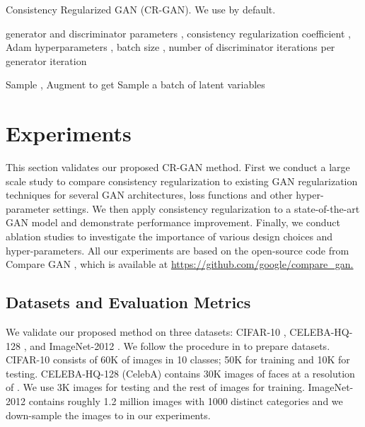 \documentclass{article} \usepackage{iclr2020_conference,times}
\begin{document}
\begin{algorithm}[t]
    \caption{Consistency Regularized GAN (CR-GAN). We use  by default.} 
    \label{alg:main}
\begin{algorithmic}[1]
    \renewcommand{\algorithmicrequire}{\textbf{Input:}}
    \renewcommand{\algorithmicensure}{\textbf{Output:}}
    \Require generator and discriminator parameters , consistency regularization coefficient , Adam hyperparameters , batch size , number of discriminator iterations per generator iteration 
    
     \For{}            \For{}
    \State Sample ,  
    \State Augment  to get 
    \State 
    \State 
    \EndFor
    \State 
    \EndFor
    \State  Sample a batch of latent variables   \State 
    \EndFor
\end{algorithmic}
\end{algorithm}



\section{Experiments}
\label{section:experiments}

This section validates our proposed CR-GAN method. First we conduct a large scale study to compare consistency regularization to existing GAN regularization techniques \citep{kodali2017convergence, WGANGP, RothLNH17} for several GAN architectures, loss functions and other hyper-parameter settings. 
We then apply consistency regularization to a state-of-the-art GAN model \citep{BIGGAN} 
and demonstrate performance improvement.
Finally, we conduct ablation studies to investigate the importance of various design choices 
and hyper-parameters. 
All our experiments are based on the open-source code from Compare GAN \citep{compare_gan},
which is available at 
{\href{https://github.com/google/compare\_gan}{https://github.com/google/compare\_gan.}}

\subsection{Datasets and Evaluation Metrics}
We validate our proposed method on three datasets: CIFAR-10 \citep{cifar10}, 
CELEBA-HQ-128 \citep{PROGRESSIVEGAN}, and ImageNet-2012 \citep{IMAGENET}.
We follow the procedure in \citet{compare_gan} to prepare datasets.
CIFAR-10 consists of 60K of  images in 10 classes; 
50K for training and 10K for testing.
CELEBA-HQ-128 (CelebA) contains 30K images of faces at a resolution of . 
We use 3K images for testing and the rest of images for training.
ImageNet-2012 contains roughly 1.2 million images with 1000 distinct categories and we down-sample the images to  in our experiments.
\end{document}
